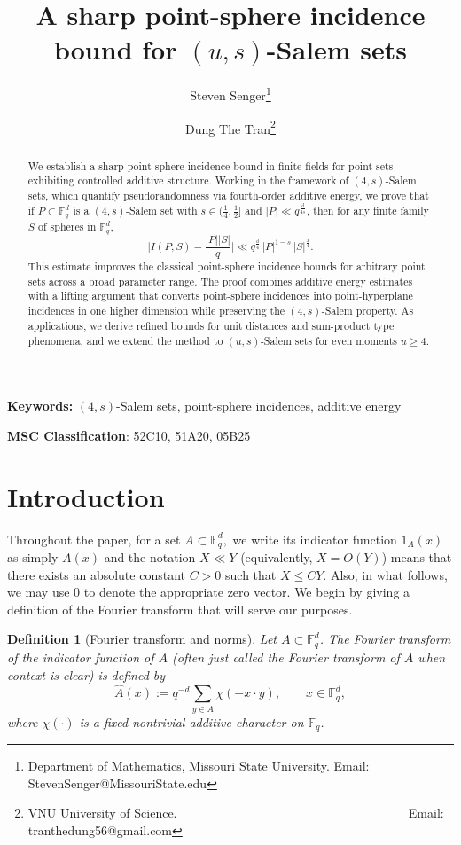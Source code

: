 \documentclass{article}
\title{A sharp point-sphere incidence bound for $(u, s)$-Salem sets}
\author{
Steven Senger\thanks{Department of Mathematics, Missouri State University. Email: StevenSenger@MissouriState.edu}\and Dung The Tran\thanks{VNU University of Science. ~~~~~~~~~~~~~~~~~~~~~~~~~~~~~~~~~~~~ Email: tranthedung56@gmail.com }
  }
\date{}
\newtheorem{definition}[theorem]{Definition}
\begin{document}
\maketitle
\begin{abstract}
We establish a sharp point-sphere incidence bound in finite fields for point sets exhibiting controlled additive structure.
Working in the framework of \((4,s)\)-Salem sets, which quantify pseudorandomness via fourth-order additive energy, we prove that if
\(P\subset \mathbb{F}_q^d\) is a \((4,s)\)-Salem set with \(s\in \big( \frac{1}{4}, \frac{1}{2} \big]\) and \(|P|\ll q^{ \frac{d}{4s}}\), then for any finite family \(S\) of spheres in \(\mathbb{F}_q^d\),
\[
\bigg| I(P,S)-\frac{|P||S| }{q} \bigg| \ll q^{\frac{d}{4}}\,|P|^{1-s}\,|S|^{\frac{3}{4}}.
\]
This estimate improves the classical point-sphere incidence bounds for arbitrary point sets across a broad parameter range. The proof combines additive energy estimates with a lifting argument that converts point-sphere incidences into point-hyperplane incidences in one higher dimension while preserving the \((4,s)\)-Salem property. As applications, we derive refined bounds for unit distances and sum-product type phenomena, and we extend the method to \((u,s)\)-Salem sets for even moments \(u\ge4\).
\end{abstract}

\textbf{Keywords:} $(4, s)$-Salem sets, point-sphere incidences, additive energy

\textbf{MSC Classification}: 52C10, 51A20, 05B25


\tableofcontents


\section{Introduction}
Throughout the paper, for a set $A\subset\mathbb{F}_q^d,$ we write its indicator function $1_A(x)$ as simply $A(x)$ and the notation $X \ll Y$ (equivalently, $X = O(Y)$)
means that there exists an absolute constant $C>0$ such that $X \leq C Y$. Also, in what follows, we may use $0$ to denote the appropriate zero vector. We begin by giving a definition of the Fourier transform that will serve our purposes.


\begin{definition}[Fourier transform and norms]
Let $A\subset\mathbb{F}_q^d$. The Fourier transform of the indicator function of $A$ (often just called the Fourier transform of $A$ when context is clear) is defined by
\[
\widehat{A}(x)
:= q^{-d}\sum_{y\in A} \chi(-x\cdot y),
\qquad x\in\mathbb{F}_q^d,
\]
where $\chi(\cdot)$ is a fixed nontrivial additive character on $\mathbb{F}_q$.
\end{definition}
\end{document}
